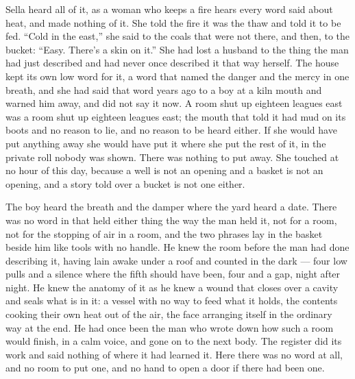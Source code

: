 \scenebreak

Sella heard all of it, as a woman who keeps a fire hears every word said about heat, and made nothing of it. She told the fire it was the thaw and told it to be fed. “Cold in the east,” she said to the coals that were not there, and then, to the bucket: “Easy. There's a skin on it.” She had lost a husband to the thing the man had just described and had never once described it that way herself. The house kept its own low word for it, a word that named the danger and the mercy in one breath, and she had said that word years ago to a boy at a kiln mouth and warned him away, and did not say it now. A room shut up eighteen leagues east was a room shut up eighteen leagues east; the mouth that told it had mud on its boots and no reason to lie, and no reason to be heard either. If she would have put anything away she would have put it where she put the rest of it, in the private roll nobody was shown. There was nothing to put away. She touched  at no hour of this day, because a well is not an opening and a basket is not an opening, and a story told over a bucket is not one either.

The boy heard the breath and the damper where the yard heard a date. There was no word in  that held either thing the way the man held it, not for a room, not for the stopping of air in a room, and the two phrases lay in the basket beside him like tools with no handle. He knew the room before the man had done describing it, having lain awake under a roof and counted  in the dark --- four low pulls and a silence where the fifth should have been, four and a gap, night after night. He knew the anatomy of it as he knew a wound that closes over a cavity and seals what is in it: a vessel with no way to feed what it holds, the contents cooking their own heat out of the air, the face arranging itself in the ordinary way at the end. He had once been the man who wrote down how such a room would finish, in a calm voice, and gone on to the next body. The register did its work and said nothing of where it had learned it. Here there was no word at all, and no room to put one, and no hand to open a door if there had been one.

